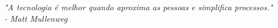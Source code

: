 \begin{epigrafe}
\vspace*{\fill}
\begin{flushright}
\emph{"A tecnologia é melhor quando aproxima as pessoas e simplifica processos." 
\\
- Matt Mullenweg}
\end{flushright}
\end{epigrafe}